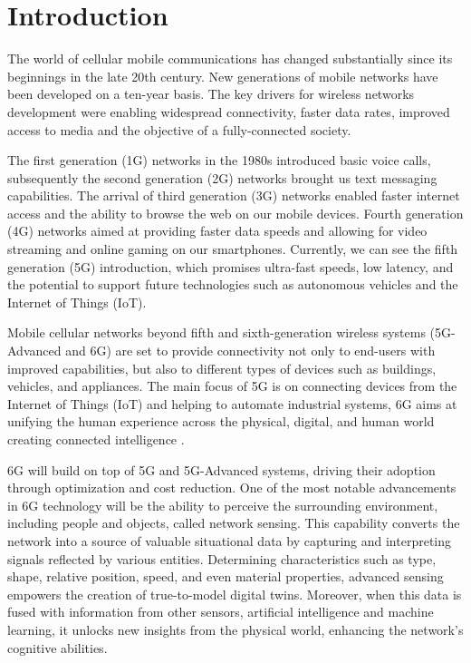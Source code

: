 \chapter{Introduction}
\label{chap_intro}

The world of cellular mobile communications has changed substantially since its beginnings in the late 20th century.
New generations of mobile networks have been developed on a ten-year basis. The key drivers for wireless networks development were enabling widespread connectivity, faster data rates, improved access to media and the objective of a fully-connected society.

The first generation (1G) networks in the 1980s introduced basic voice calls, subsequently the second generation (2G) networks brought us text messaging capabilities. The arrival of third generation (3G) networks enabled faster internet access and the ability to browse the web on our mobile devices. 
Fourth generation (4G) networks aimed at providing faster data speeds and allowing for video streaming and online gaming on our smartphones. 
Currently, we can see the fifth generation (5G) introduction, which promises ultra-fast speeds, low latency, and the potential to support future technologies such as autonomous vehicles and the Internet of Things (IoT). 

Mobile cellular networks beyond fifth and sixth-generation wireless systems (5G-Advanced and 6G) are set to provide connectivity not only to end-users with improved capabilities, but also to different types of devices such as buildings, vehicles, and appliances.
The main focus of 5G is on connecting devices from the Internet of Things (IoT) and helping to automate industrial systems, 6G aims at unifying the human experience across the physical, digital, and human world creating connected intelligence \cite{6G-explained-NOKIA}.


6G will build on top of 5G and 5G-Advanced systems, driving their adoption through optimization and cost reduction. 
One of the most notable advancements in 6G technology will be the ability to perceive the surrounding environment, including people and objects, called network sensing. This capability converts the network into a source of valuable situational data by capturing and interpreting signals reflected by various entities. 
Determining characteristics such as type, shape, relative position, speed, and even material properties, advanced sensing empowers the creation of true-to-model digital twins.
Moreover, when this data is fused with information from other sensors, artificial intelligence and machine learning, it unlocks new insights from the physical world, enhancing the network's cognitive abilities.


